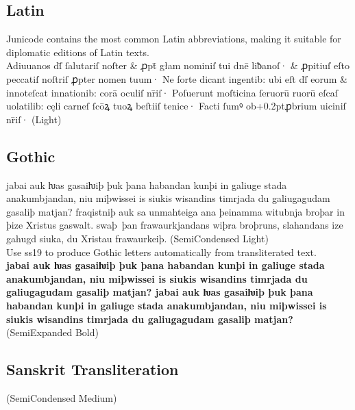 \documentclass[12pt,letterpaper,openany]{book}
\begin{document}
\subsection*{Latin}

{\small\semiconditalic Junicode contains the most common Latin abbreviations,
  making it suitable for diplomatic editions of Latin texts.}\\[1ex]
{\light Adiuuanos dſ̄ ſalutariſ noſter \&
 ꝓpt̄ głam nominiſ tui dnē liƀanoſ· \& ꝓpitiuſ eſto peccatiſ noſtriſ
 ꝓpter nomen tuum· Ne forte dicant ingentib: ubi eſt dſ̄ eorum \&
  innoteſcat innationib: corā oculiſ nr̄iſ· Poſuerunt moſticina
  ſeruorū ruorū eſcaſ uolatilib: cęli carneſ ſcōꝝ tuoꝝ beſtiiſ tenice·
  Facti ſumꝰ ob\kern+0.2ptꝓbrium uiciniſ nr̄iſ·} (Light)

\subsection*{Gothic}

{\seminarrowlight jabai auk ƕas gasaiƕiþ þuk þana habandan kunþi in galiuge stada
anakumbjandan, niu miþwissei is siukis wis\-an\-dins timrjada du
galiugagudam gasaliþ matjan?  fraqistniþ auk sa unmahteiga ana
þeinamma witubnja broþar in þize Xristus gaswalt.  swaþ~þan
frawaurkjandans wiþra broþruns, slahandans ize gahugd siuka, du
Xristau fra\-waur\-keiþ.} (SemiCondensed Light)\\

{\noindent\small\semiconditalic Use ss19 to produce Gothic letters
  automatically from transliterated text.}\\[1ex]
{\bfseries jabai auk ƕas gasaiƕiþ þuk þana
  habandan kunþi in ga\-liuge stada anakumbjandan, niu miþwissei is
  siukis wis\-an\-dins timrjada du galiugagudam gasaliþ matjan?
  jabai auk ƕas gasaiƕiþ þuk þana habandan kunþi in
    ga\-liuge stada anakumbjandan, niu miþwissei is siukis
    wis\-an\-dins timrjada du galiugagudam gasaliþ matjan?} (SemiExpanded Bold)

  \subsection*{Sanskrit Transliteration}

 (SemiCondensed Medium)
\end{document}
